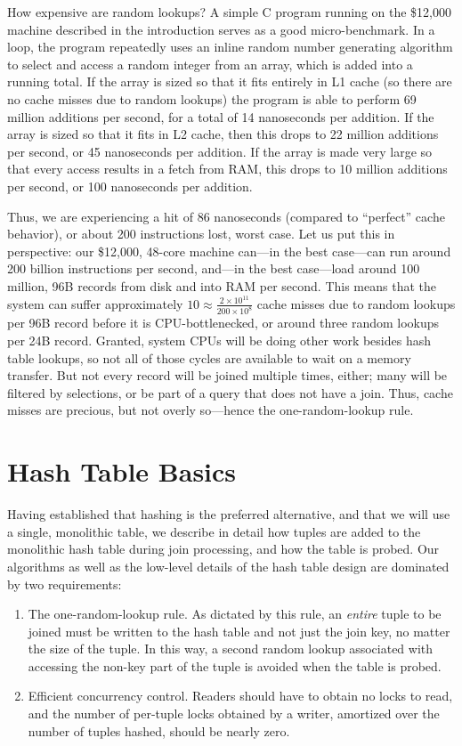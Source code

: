 \documentclass{sig-alternate}
\renewcommand\:{\colon} %
\begin{document}
How expensive are random lookups?  A simple C program running on the \$12,000 machine described in the introduction
serves as a good micro-benchmark.  
In a loop, the program repeatedly uses an 
inline random number generating algorithm to select and access
a random integer from an array, which is added
into a running total.  
If the array is sized so that it fits entirely in L1 cache (so there are no cache misses due to random lookups) the program is able to perform 
69 million additions per second, for a total of 14 nanoseconds per addition.  If the array is sized so that it fits in L2 cache, then
this drops to 22 million additions per second, or 45 nanoseconds per addition.  
If the array is made very large so that every access results
in a fetch from RAM, this drops to 10 million additions per second, or 100 nanoseconds per addition.

Thus, we are experiencing a hit of 86 nanoseconds (compared to ``perfect'' cache behavior), or about 200 instructions lost, worst case.
Let us put this in perspective: our \$12,000, 48-core machine can---in the best case---can run around 200 billion
instructions per second, and---in the best case---load around
100 million, 96B records from disk and into RAM per second.  This means that the system
can suffer approximately $10 \approx \frac{2 \times 10^{11}}{200 \times 10^8}$ cache misses due to random lookups
per 96B record before it is CPU-bottlenecked, or
around three random lookups per 24B record.  
Granted, system CPUs will be doing other work besides hash table lookups, so not all of those cycles are available to wait on a memory
transfer.  But not every record will be joined multiple times, either; many will be filtered by selections,   
or be part of a query that does not have a join.
Thus, cache misses are precious, but not overly so---hence the one-random-lookup rule.

\section{Hash Table Basics}

Having established that hashing is the preferred alternative, and that we will use a single, monolithic table,
we describe in detail how tuples are added to the monolithic hash table during join processing, and how 
the table is probed.
Our algorithms as well as the low-level details of the hash table design are dominated by two requirements:

\begin{enumerate} 

\item
The one-random-lookup rule.
As dictated by this rule, an \emph{entire} tuple to be joined must be written to the hash
table and not just the join key, no matter
the size of the tuple.
In this way, a second
random lookup associated with accessing the non-key part of the tuple is avoided when the table is probed.

\item 
Efficient concurrency control. Readers should have to obtain no locks to read, and the number of per-tuple locks obtained
by a writer, amortized over the number of tuples hashed, should be nearly zero.
\end{enumerate}
\end{document}
